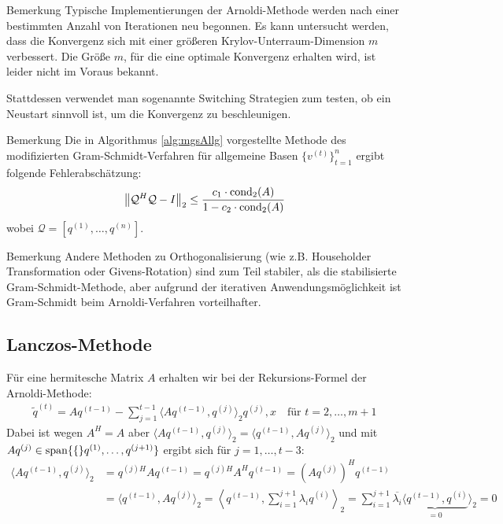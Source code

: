 \begin{colbox}{Bemerkung}
  Typische Implementierungen der Arnoldi-Methode werden nach einer bestimmten Anzahl von Iterationen neu begonnen.
  Es kann untersucht werden, dass die Konvergenz sich mit einer größeren Krylov-Unterraum-Dimension $m$ verbessert.
  Die Größe $m$, für die eine optimale Konvergenz erhalten wird, ist leider nicht im Voraus bekannt. 

  Stattdessen verwendet man sogenannte \glqq{}Switching\grqq{} Strategien zum testen, ob ein Neustart sinnvoll ist, 
  um die Konvergenz zu beschleunigen.
\end{colbox}

\begin{colbox}{Bemerkung}
  Die in Algorithmus \ref{alg:mgsAllg} vorgestellte Methode des modifizierten Gram-Schmidt-Verfahren für allgemeine 
  Basen $\{v^{(t)}\}_{t=1}^n$ ergibt folgende Fehlerabschätzung:
  \begin{align*}
    \vertn{2}{\mathcal{Q}^{H}\mathcal{Q}-I}_2 \leq \dfrac{c_1\cdot \Cond_2(A)}{1-c_2\cdot\Cond_2(A)}
  \end{align*}
  wobei $\mathcal{Q} = [q^{(1)}, \dots, q^{(n)}]$.
\end{colbox}

\begin{colbox}{Bemerkung}
  Andere Methoden zu Orthogonalisierung (wie z.B. Householder Transformation oder Givens-Rotation) sind zum Teil 
  stabiler, als die stabilisierte Gram-Schmidt-Methode, aber aufgrund der iterativen Anwendungsmöglichkeit ist 
  Gram-Schmidt beim Arnoldi-Verfahren vorteilhafter.
\end{colbox}

\subsection{Lanczos-Methode}
Für eine hermitesche Matrix $A$ erhalten wir bei der Rekursions-Formel der Arnoldi-Methode:
%
\begin{align*}
  \tilde{q}^{(t)} 
  = Aq^{(t-1)} - \sum_{j=1}^{t-1} \langle Aq^{(t-1)}, q^{(j)}\rangle_2 q^{(j)},
  x\quad \text{für } t=2,\dots,m+1
\end{align*}
%
Dabei ist wegen $A^H=A$ aber $\langle Aq^{(t-1)}, q^{(j)}\rangle_2 = \langle q^{(t-1)}, Aq^{(j)}\rangle_2$ und 
mit $Aq^{(j)}\in\text{span}\{\{\}q^{(1)},\dots,q^{(j+1)}\}$ ergibt sich für $j=1,\dots,t-3$:
%
\begin{align*}
  \langle Aq^{(t-1)}, q^{(j)}\rangle_2 
  &= q^{(j)H}Aq^{(t-1)}
  = q^{(j)H}A^Hq^{(t-1)}
  = (Aq^{(j)})^Hq^{(t-1)} \\
  &= \langle q^{(t-1)}, Aq^{(j)}\rangle_2 
  = \left\langle q^{(t-1)}, \sum_{i=1}^{j+1} \lambda_i q^{(i)}\right\rangle _2 
  = \sum_{i=1}^{j+1} \overline{\lambda_i} \underbrace{\langle q^{(t-1)}, q^{(i)}}_{=0}\rangle _2 
  = 0
\end{align*}

